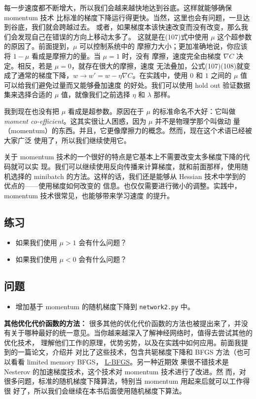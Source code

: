 每一步速度都不断增大，所以我们会越来越快地达到谷底。这样就能够确保 momentum 技术
比标准的梯度下降运行得更快。当然，这里也会有问题，一旦达到谷底，我们就会跨越过去。
或者，如果梯度本该快速改变而没有改变，那么我们会发现自己在错误的方向上移动太多了。
这就是在(107)式中使用 $\mu$ 这个超参数的原因了。前面提到，$\mu$ 可以控制系统中的
摩擦力大小；更加准确地说，你应该将 $1-\mu$ 看成是摩擦力的量。当 $\mu=1$ 时，没有
摩擦，速度完全由梯度 $\nabla C$ 决定。相反，若是 $\mu=0$，就存在很大的摩擦，速度
无法叠加，公式(107)(108)就变成了通常的梯度下降，$w\rightarrow w'=w-\eta \nabla
C$。在实践中，使用 $0$ 和 $1$ 之间的 $\mu$ 值可以给我们避免过量而又能够叠加速度
的好处。我们可以使用 hold out 验证数据集来选择合适的 $\mu$ 值，就像我们之前选择
$\eta$ 和 $\lambda$ 那样。

我到现在也没有把 $\mu$ 看成是超参数。原因在于 $\mu$ 的标准命名不大好：它叫做
\emph{moment co-efficient}。这其实很让人困惑，因为 $\mu$ 并不是物理学那个叫做动
量（momentum）的东西。并且，它更像摩擦力的概念。然而，现在这个术语已经被大家广泛
使用了，所以我们继续使用它。

关于 momentum 技术的一个很好的特点是它基本上不需要改变太多梯度下降的代码就可以实
现。我们可以继续使用反向传播来计算梯度，就和前面那样，使用随机选择的 minibatch
的方法。这样的话，我们还是能够从 Hessian 技术中学到的优点的——使用梯度如何改变的
信息。也仅仅需要进行微小的调整。实践中，momentum 技术很常见，也能够带来学习速度
的提升。

\subsection*{练习}

\begin{itemize}
\item 如果我们使用 $\mu > 1$ 会有什么问题？
\item 如果我们使用 $\mu < 0$ 会有什么问题？
\end{itemize}

\subsection*{问题}

\begin{itemize}
\item 增加基于 momentum 的随机梯度下降到 \lstinline!network2.py! 中。
\end{itemize}

\textbf{其他优化代价函数的方法：} 很多其他的优化代价函数的方法也被提出来了，并没
有关于哪种最好的统一意见。当你越来越深入了解神经网络时，值得去尝试其他的优化技术，
理解他们工作的原理，优势劣势，以及在实践中如何应用。前面我提到的一篇论文，介绍并
对比了这些技术，包含共轭梯度下降和 BFGS 方法（也可以看看 limited memory BFGS，
  \href{http://en.wikipedia.org/wiki/Limited-memory_BFGS}{L-BFGS}。另一种近期效
  果很不错技术是 Nesterov 的加速梯度技术，这个技术对 momentum 技术进行了改进。然
  而，对很多问题，标准的随机梯度下降算法，特别当 momentum 用起来后就可以工作得很
  好了，所以我们会继续在本书后面使用随机梯度下算法。

